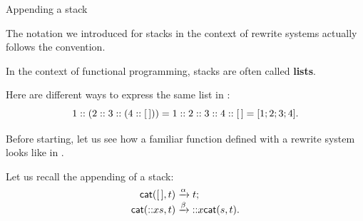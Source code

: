 %
\begin{frame}{Appending a stack}

  The notation we introduced for stacks in the context of rewrite
  systems actually follows the \OCaml convention.

  \bigskip

  In the context of functional programming, stacks are often called
  \textbf{lists}.

  \bigskip

  Here are different ways to express the same list in \OCaml:
  \begin{equation*}
    1::(2::3::(4::[\,])) = 1::2::3::4::[\,] = [1;2;3;4].
  \end{equation*}

  Before starting, let us see how a familiar function defined with a
  rewrite system looks like in \OCaml.

  \bigskip

  Let us recall the appending of a stack:
  \begin{align*}
    \textsf{cat}(        [\,],t) &\xrightarrow{\smash{\alpha}} t;\\
    \textsf{cat}(\textsf{::}{x}{s},t) &\xrightarrow{\smash{\beta}} \textsf{::}{x}{\textsf{cat}(s,t)}.
  \end{align*}

\end{frame}


